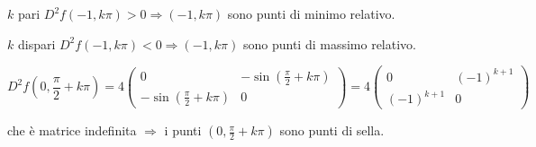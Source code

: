 \begin{exbar}
\begin{example}
	$k$ pari $D^2f(-1,k\pi) >0 \Rightarrow (-1,k\pi)$ sono punti di minimo relativo.
	
	$k$ dispari $D^2f(-1,k\pi)< 0 \Rightarrow (-1,k\pi)$ sono punti di massimo relativo.
	
	$$D^2f(0,\frac{\pi}{2}+k \pi)=4 
	\begin{pmatrix}
		0 & -\sin(\frac{\pi}{2}+k\pi)\\
		-\sin(\frac{\pi}{2}+k\pi)& 0
	\end{pmatrix}=
	4 \begin{pmatrix}
		0&(-1)^{k+1}\\
		(-1)^{k+1}&0
	\end{pmatrix}$$
	
	che è matrice indefinita $\Rightarrow$ i punti $(0,\frac{\pi}{2}+k \pi)$ sono punti di sella.
\end{example}
\end{exbar}


